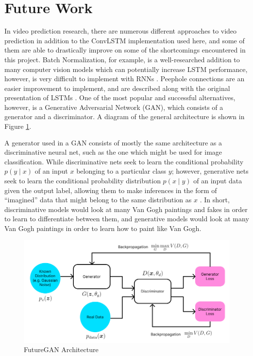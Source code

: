 \documentclass{scrartcl}
\begin{document}
\newpage
\section{Future Work}
\label{sec:future_work}

In video prediction research, there are numerous different approaches to video
prediction in addition to the ConvLSTM implementation used here, and some of
them are able to drastically improve on some of the shortcomings encountered in
this project. Batch Normalization, for example, is a well-researched addition
to many computer vision models which can potentially increase LSTM performance,
however, is very difficult to implement with RNNs \cite{batchnorm}. Peephole
connections are an easier improvement to implement, and are described along
with the original presentation of LSTMs \cite{lstm_original}. One of the most
popular and successful alternatives, however, is a Generative Adversarial
Network (GAN), which consists of a generator and a discriminator. A diagram of
the general architecture is shown in Figure \ref{fig:gan_arch}.

A generator used in a GAN consists of mostly the same architecture as a
discriminative neural net, such as the one which might be used for image
classification. While discriminative nets seek to learn the conditional
probability $p(y \mid x)$ of an input $x$ belonging to a particular class $y$;
however, generative nets seek to learn the conditional probability distribution
$p(x \mid y)$ of an input data given the output label, allowing them to make
inferences in the form of ``imagined'' data that might belong to the same
distribution as $x$ \cite{gan_original}. In short, discriminative models would
look at many Van Gogh paintings and fakes in order to learn to differentiate
between them, and generative models would look at many Van Gogh paintings in
order to learn how to paint like Van Gogh. 

\begin{figure}[H]
	\begin{center}
		\includegraphics[width=1\textwidth]{figures/gan_arch.png}
	\end{center}
	\caption{FutureGAN Architecture}
	\label{fig:gan_arch}
\end{figure}
\end{document}
